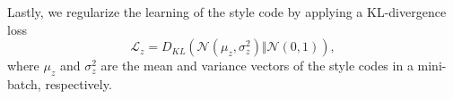 Lastly, we regularize the learning of the style code by applying a KL-divergence loss
\begin{equation}
    \mathcal{L}_{z} = D_{KL}(\mathcal{N}(\mu_z, \sigma^2_z) \Vert \mathcal{N}(0, 1)),
\end{equation}
where $\mu_z$ and $\sigma^2_z$ are the mean and variance vectors of the style codes in a mini-batch, respectively.